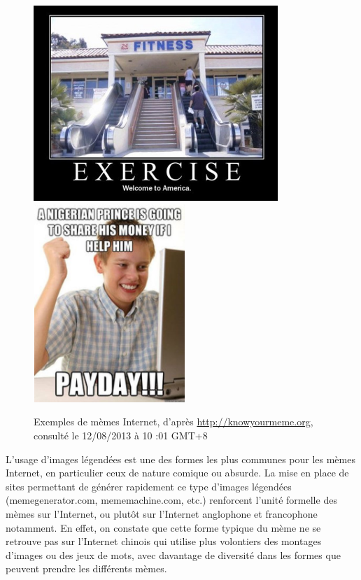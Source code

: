 \begin{figure}[h]
    \centering
    \includegraphics[width=3.6335in,height=2.9114in]{figures/chap2/chapitre2-img3.jpg}
    \includegraphics[width=2.2559in,height=2.9449in]{figures/chap2/chapitre2-img4.jpg}
    \caption[Exemples de m\`emes internet]{Exemples de m\`emes Internet, d{\textquoteright}apr\`es \url{http://knowyourmeme.org}, consult\'e le 12/08/2013 \`a 10 :01 GMT+8}
    \label{fig:memes-examples}
\end{figure}


L{\textquoteright}usage d{\textquoteright}images l\'egend\'ees est une des formes les plus communes pour les m\`emes Internet, en particulier ceux de nature comique ou absurde. La mise en place de sites permettant de g\'en\'erer rapidement ce type d{\textquoteright}images l\'egend\'ees (memegenerator.com, mememachine.com, etc.) renforcent l{\textquoteright}unit\'e formelle des m\`emes sur l{\textquoteright}Internet, ou plut\^ot sur l{\textquoteright}Internet anglophone et francophone notamment. En effet, on constate que cette forme typique du m\`eme ne se retrouve pas sur l{\textquoteright}Internet chinois qui utilise plus volontiers des montages d{\textquoteright}images ou des jeux de mots, avec davantage de diversit\'e dans les formes que peuvent prendre les diff\'erents m\`emes.

